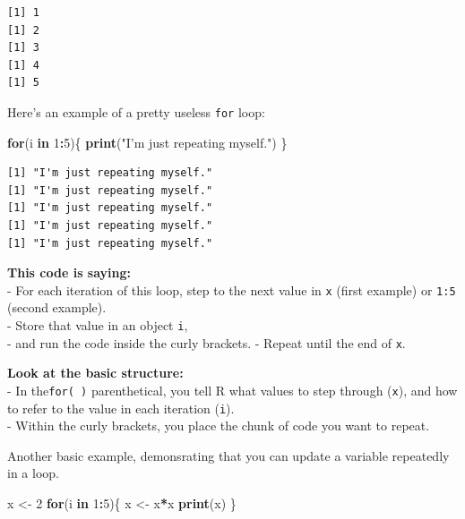 \documentclass[
]{book}
\newenvironment{Shaded}{\begin{snugshade}}{\end{snugshade}}
\newcommand{\ControlFlowTok}[1]{\textcolor[rgb]{0.13,0.29,0.53}{\textbf{#1}}}
\newcommand{\DecValTok}[1]{\textcolor[rgb]{0.00,0.00,0.81}{#1}}
\newcommand{\KeywordTok}[1]{\textcolor[rgb]{0.13,0.29,0.53}{\textbf{#1}}}
\newcommand{\NormalTok}[1]{#1}
\newcommand{\OperatorTok}[1]{\textcolor[rgb]{0.81,0.36,0.00}{\textbf{#1}}}
\newcommand{\StringTok}[1]{\textcolor[rgb]{0.31,0.60,0.02}{#1}}
\begin{document}
\begin{verbatim}
[1] 1
[1] 2
[1] 3
[1] 4
[1] 5
\end{verbatim}

Here's an example of a pretty useless \texttt{for} loop:

\begin{Shaded}
\begin{Highlighting}[]
\ControlFlowTok{for}\NormalTok{(i }\ControlFlowTok{in} \DecValTok{1}\OperatorTok{:}\DecValTok{5}\NormalTok{)\{}
  \KeywordTok{print}\NormalTok{(}\StringTok{"I'm just repeating myself."}\NormalTok{)}
\NormalTok{\}}
\end{Highlighting}
\end{Shaded}

\begin{verbatim}
[1] "I'm just repeating myself."
[1] "I'm just repeating myself."
[1] "I'm just repeating myself."
[1] "I'm just repeating myself."
[1] "I'm just repeating myself."
\end{verbatim}

\textbf{This code is saying:}\\
- For each iteration of this loop, step to the next value in \texttt{x} (first example) or \texttt{1:5} (second example).\\
- Store that value in an object \texttt{i},\\
- and run the code inside the curly brackets.
- Repeat until the end of \texttt{x}.

\textbf{Look at the basic structure:}\\
- In the\texttt{for(\ )} parenthetical, you tell R what values to step through (\texttt{x}), and how to refer to the value in each iteration (\texttt{i}).\\
- Within the curly brackets, you place the chunk of code you want to repeat.

Another basic example, demonsrating that you can update a variable repeatedly in a loop.

\begin{Shaded}
\begin{Highlighting}[]
\NormalTok{x <-}\StringTok{ }\DecValTok{2}
\ControlFlowTok{for}\NormalTok{(i }\ControlFlowTok{in} \DecValTok{1}\OperatorTok{:}\DecValTok{5}\NormalTok{)\{}
\NormalTok{  x <-}\StringTok{ }\NormalTok{x}\OperatorTok{*}\NormalTok{x}
  \KeywordTok{print}\NormalTok{(x)}
\NormalTok{\}}
\end{Highlighting}
\end{Shaded}
\end{document}
